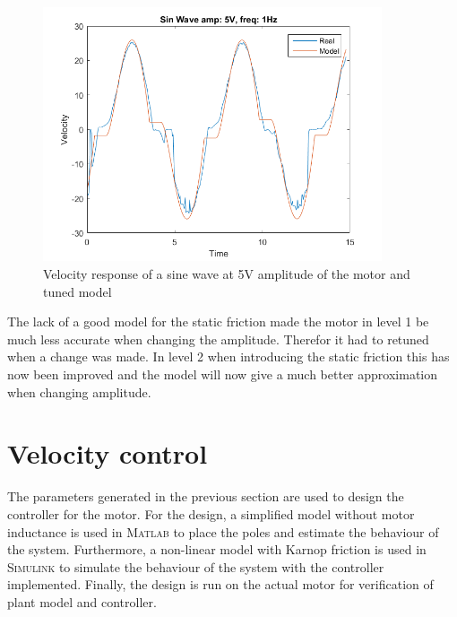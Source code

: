 \documentclass[12pt,a4paper]{article}
\begin{document}
\begin{figure}[H]
    \centering
    \includegraphics[width=100mm]{l2_sin_a5_f1.png}
    \caption{Velocity response of a sine wave at 5V amplitude of the
    motor and tuned model}
    \label{fig:l2_sin_a5_f1}
\end{figure} 
The lack of a good model for the static friction made the
motor in level 1 be much less accurate when changing the amplitude.
Therefor it had to retuned when a change was made. In level 2 when
introducing the static friction this has now been improved and the model
will now give a much better approximation when changing amplitude.


\section*{Velocity control}
\label{sec:velocity_control}
The parameters generated in the previous section are used to design the
controller for the motor. For the design, a simplified model without motor
inductance is used in \textsc{Matlab} to place the poles and estimate the
behaviour of the system. Furthermore, a non-linear model with Karnop friction is
used in \textsc{Simulink} to simulate the behaviour of the system with the
controller implemented. Finally, the design is run on the actual motor for
verification of plant model and controller.
\end{document}
